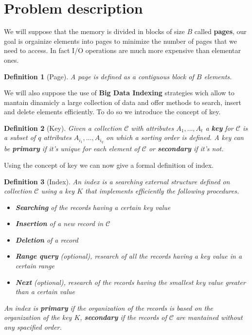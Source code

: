 \documentclass{report}
\newtheorem{defin}{Definition}[chapter]
\begin{document}
\section{Problem description}
We will suppose that the memory is divided in blocks of size \(B\) called \textbf{pages}, our goal is orgainize elements into pages to minimize the number of pages that we need to access. In fact I/O operations are much more expensive than elementar ones.
\begin{defin}[Page]
    A page is defined as a contiguous block of \(B\) elements.
\end{defin}
\noindent
We will also suppose the use of \textbf{Big Data Indexing} strategies wich allow to mantain dinamicly a large collection of data and offer methods to search, insert and delete elements efficiently. To do so we introduce the concept of key.
\begin{defin}[Key]
    Given a collection \(\mathcal{C}\) with attributes \(A_1,\dots, A_t\) a \textbf{key} for \(\mathcal{C}\) is a subset of \(q\) attributes \(A_{i_1},\dots, A_{i_q}\) on which a sorting order is defined. A key can be \textbf{primary} if it's unique for each element of \(\mathcal{C}\) or \textbf{secondary} if it's not.
\end{defin}
\noindent Using the concept of key we can now give a formal definition of index.
\begin{defin}[Index]
    An index is a searching external structure defined on collection \(\mathcal{C}\) using a key \(K\) that implements efficiently the following procedures.
    \begin{itemize}
        \item \textbf{Searching} of the records having a certain key value
        \item \textbf{Insertion} of a new record in \(\mathcal{C}\)
        \item \textbf{Deletion} of a record
        \item \textbf{Range query} (optional), research of all the records having a key value in a certain range
        \item \textbf{Next} (optional), research of the records having the smallest key value greater than a certain value
    \end{itemize}
    An index is \textbf{primary} if the organization of the records is based on the organization of the key \(K\), \textbf{secondary} if the records of \(\mathcal{C}\) are mantained without any spacified order.
\end{defin}
\end{document}
